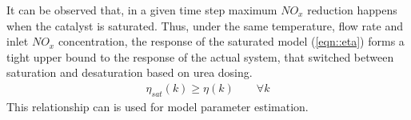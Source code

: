 It can be observed that, in a given time step maximum $NO_x$ reduction happens when the catalyst is saturated. Thus,
under the same temperature, flow rate and inlet $NO_x$ concentration, the response of the saturated model
(\ref{eqn::eta}) forms a tight upper bound to the response of the actual system, that switched between saturation and
desaturation based on urea dosing.
\begin{align}
        \eta_{sat}(k) \geq \eta(k) \qquad \forall k
        \label{eqn::eta_bound}
\end{align}
This relationship can is used for model parameter estimation.
